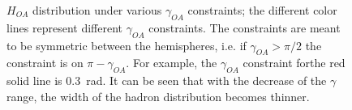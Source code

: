 \begin{figure}[h]
  \centering     %
  \caption{$H_{OA}$ distribution under various $\gamma_{OA}$ constraints; the different color lines represent different $\gamma_{OA}$ constraints. The constraints are meant to be symmetric between the hemispheres, i.e. if  $\gamma_{OA}> \pi/2$ the constraint is on $\pi-\gamma_{OA} $.  For example, the $\gamma_{OA}$ constraint forthe red solid line is 0.3~rad. It can be seen that with the decrease of the $\gamma$ range, the width of the hadron distribution becomes thinner.}
  \label{fig:OAs}
\end{figure}



